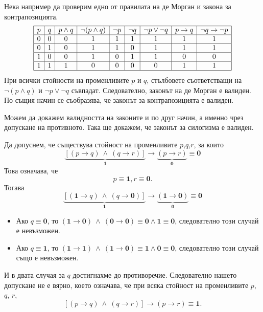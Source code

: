 \begin{example}
  Нека например да проверим едно от правилата на де Морган и закона
  за контрапозицията.
  \[
  \begin{array}{|c|c|c|c|c|c|c|c|c|}
    \hline
    p & q & p\wedge q & \neg(p\wedge q) & \neg p & \neg q & \neg p \vee \neg q & p \rightarrow q & \neg q \rightarrow \neg p\\
    \hline
    0 & 0 & 0 & 1 & 1 & 1 & 1 & 1 & 1 \\
    \hline
    0 & 1 & 0 & 1 & 1 & 0 & 1 & 1 & 1 \\
    \hline
    1 & 0 & 0 & 1 & 0 & 1 & 1 & 0 & 0 \\
    \hline
    1 & 1 & 1 & 0 & 0 & 0 & 0 & 1 & 1 \\
    \hline
  \end{array}
  \]
  При всички стойности на променливите $p$ и $q$, стълбовете съответстващи на $\neg(p \wedge q)$ и $\neg p \vee \neg q$
  съвпадат. Следователно, законът на де Морган е валиден.
  По същия начин се съобразява, че законът за контрапозицията е валиден.
\end{example}


\begin{example}
  Можем да докажем валидността на законите и по друг начин, а именно чрез допускане на противното.
  Така ще докажем, че законът за силогизма е валиден.
  
  Да допуснем, че съществува стойност на променливите $p$,$q$,$r$, за които
  \[\underbrace{[(p\rightarrow q)\ \wedge\ (q\rightarrow r)]}_{\mathbf{1}} \rightarrow \underbrace{(p\rightarrow r)}_{\mathbf{0}} \equiv {\mathbf 0}\]
  Това означава, че
  \[p \equiv \mathbf{1}, r \equiv \mathbf{0}.\]
  Тогава
  \[\underbrace{[(\mathbf{1}\rightarrow q)\ \wedge\ (q\rightarrow \mathbf{0})]}_{\mathbf{1}} \rightarrow \underbrace{(\mathbf{1}\rightarrow \mathbf{0})}_{\mathbf{0}} \equiv {\mathbf 0}\]
  \begin{itemize}
  \item 
    Ако $q \equiv \mathbf{0}$, то $(\mathbf{1}\rightarrow \mathbf{0})\ \wedge\ (\mathbf{0}\rightarrow \mathbf{0}) \equiv \mathbf{0} \wedge \mathbf{1} \equiv \mathbf{0}$,
    следователно този случай е невъзможен.
  \item
    Ако $q \equiv \mathbf{1}$, то $(\mathbf{1}\rightarrow \mathbf{1})\ \wedge\ (\mathbf{1}\rightarrow \mathbf{0}) \equiv \mathbf{1} \wedge \mathbf{0} \equiv \mathbf{0}$,
    следователно този случай също е невъзможен.
  \end{itemize}
  И в двата случая за $q$ достигнахме до противоречие.
  Следователно нашето допускане не е вярно, което означава, че
  при всяка стойност на променливите $p$, $q$, $r$,
  \[[(p\rightarrow q)\ \wedge\ (q\rightarrow r)] \rightarrow (p\rightarrow r) \equiv {\mathbf 1}.\]
\end{example}


